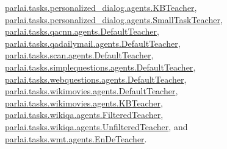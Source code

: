\hyperlink{classparlai_1_1tasks_1_1personalized__dialog_1_1agents_1_1KBTeacher}{parlai.\+tasks.\+personalized\+\_\+dialog.\+agents.\+K\+B\+Teacher}, \hyperlink{classparlai_1_1tasks_1_1personalized__dialog_1_1agents_1_1SmallTaskTeacher}{parlai.\+tasks.\+personalized\+\_\+dialog.\+agents.\+Small\+Task\+Teacher}, \hyperlink{classparlai_1_1tasks_1_1qacnn_1_1agents_1_1DefaultTeacher}{parlai.\+tasks.\+qacnn.\+agents.\+Default\+Teacher}, \hyperlink{classparlai_1_1tasks_1_1qadailymail_1_1agents_1_1DefaultTeacher}{parlai.\+tasks.\+qadailymail.\+agents.\+Default\+Teacher}, \hyperlink{classparlai_1_1tasks_1_1scan_1_1agents_1_1DefaultTeacher}{parlai.\+tasks.\+scan.\+agents.\+Default\+Teacher}, \hyperlink{classparlai_1_1tasks_1_1simplequestions_1_1agents_1_1DefaultTeacher}{parlai.\+tasks.\+simplequestions.\+agents.\+Default\+Teacher}, \hyperlink{classparlai_1_1tasks_1_1webquestions_1_1agents_1_1DefaultTeacher}{parlai.\+tasks.\+webquestions.\+agents.\+Default\+Teacher}, \hyperlink{classparlai_1_1tasks_1_1wikimovies_1_1agents_1_1DefaultTeacher}{parlai.\+tasks.\+wikimovies.\+agents.\+Default\+Teacher}, \hyperlink{classparlai_1_1tasks_1_1wikimovies_1_1agents_1_1KBTeacher}{parlai.\+tasks.\+wikimovies.\+agents.\+K\+B\+Teacher}, \hyperlink{classparlai_1_1tasks_1_1wikiqa_1_1agents_1_1FilteredTeacher}{parlai.\+tasks.\+wikiqa.\+agents.\+Filtered\+Teacher}, \hyperlink{classparlai_1_1tasks_1_1wikiqa_1_1agents_1_1UnfilteredTeacher}{parlai.\+tasks.\+wikiqa.\+agents.\+Unfiltered\+Teacher}, and \hyperlink{classparlai_1_1tasks_1_1wmt_1_1agents_1_1EnDeTeacher}{parlai.\+tasks.\+wmt.\+agents.\+En\+De\+Teacher}.



